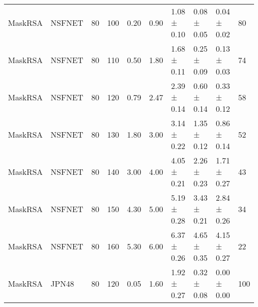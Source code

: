 \begin{longtable}[!htbp]{llll|lllll|l}
MaskRSA              & NSFNET            & 80                   & 100                                                               & 0.20  & \multicolumn{1}{l|}{0.90}     & 1.08 ± 0.10 & 0.08 ± 0.05      & 0.04 ± 0.02                  & 80                                                                                    \\
MaskRSA              & NSFNET            & 80                   & 110                                                               & 0.50  & \multicolumn{1}{l|}{1.80}     & 1.68 ± 0.11 & 0.25 ± 0.09      & 0.13 ± 0.03                  & 74                                                                                    \\
MaskRSA              & NSFNET            & 80                   & 120                                                               & 0.79 & \multicolumn{1}{l|}{2.47}    & 2.39 ± 0.14 & 0.60 ± 0.14      & 0.33 ± 0.12                  & 58                                                                                    \\
MaskRSA              & NSFNET            & 80                   & 130                                                               & 1.80  & \multicolumn{1}{l|}{3.00}       & 3.14 ± 0.22 & 1.35 ± 0.12      & 0.86 ± 0.14                  & 52                                                                                    \\
MaskRSA              & NSFNET            & 80                   & 140                                                               & 3.00    & \multicolumn{1}{l|}{4.00}       & 4.05 ± 0.21 & 2.26 ± 0.23      & 1.71 ± 0.27                  & 43                                                                                    \\
MaskRSA              & NSFNET            & 80                   & 150                                                               & 4.30  & \multicolumn{1}{l|}{5.00}       & 5.19 ± 0.28 & 3.43 ± 0.21      & 2.84 ± 0.26                  & 34                                                                                    \\
MaskRSA              & NSFNET            & 80                   & 160                                                               & 5.30  & \multicolumn{1}{l|}{6.00}       & 6.37 ± 0.26 & 4.65 ± 0.35      & 4.15 ± 0.27                  & 22                                                                                    \\
MaskRSA              & JPN48             & 80                   & 120                                                               & 0.05 & \multicolumn{1}{l|}{1.60}     & 1.92 ± 0.27 & 0.32 ± 0.08      & 0.00 ± 0.00                  & 100                                                                                    \\

\end{longtable}
